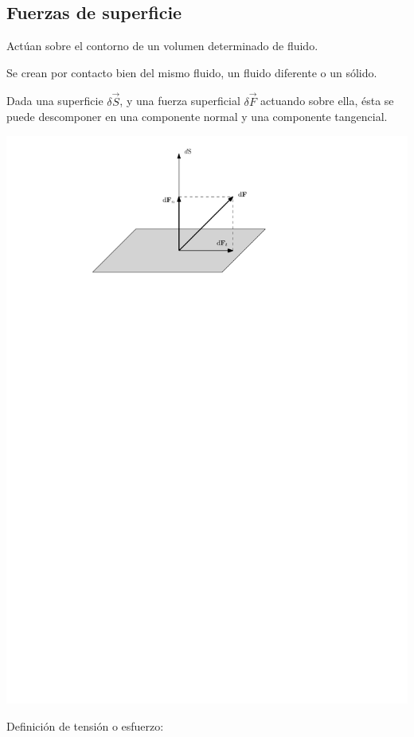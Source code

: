 \subsection{Fuerzas de superficie}

Act\'uan sobre el contorno de un  volumen determinado de fluido.

Se crean por contacto bien del mismo fluido, un fluido diferente o un s\'olido.

Dada una superficie $\delta \vec S$, y una fuerza superficial $\delta \vec F$ actuando sobre ella, \'esta se
puede descomponer en una componente normal y una componente tangencial.

\begin{center}
	\includegraphics{TeX_files/chapter01-Introduccion/dS.pdf}
\end{center}

Definici\'on de tensi\'on o esfuerzo:

